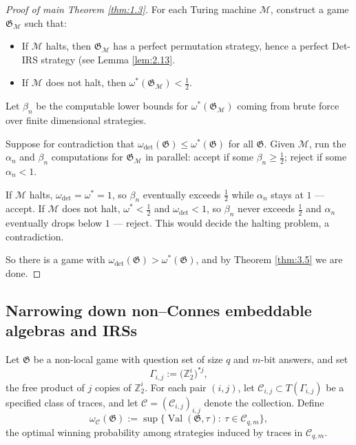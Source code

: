 \documentclass[pdflatex,sn-mathphys-num]{sn-jnl}%
\begin{document}
\begin{proof}[Proof of main Theorem \ref{thm:1.3}]
    For each Turing machine $\mathcal{M}$, \cite{bowen_aldous--lyons_2024} construct a game $\mathfrak{G}_\mathcal{M}$ such that:
    \begin{itemize}
        \item If $\mathcal{M}$ halts, then $\mathfrak{G}_\mathcal{M}$ has a perfect permutation strategy, hence a perfect Det-IRS strategy (see Lemma \ref{lem:2.13}.
        \item If $\mathcal{M}$ does not halt, then $\omega^*(\mathfrak{G}_\mathcal{M}) < \tfrac12$.
    \end{itemize}
    Let $\beta_n$ be the computable lower bounds for $\omega^*(\mathfrak{G}_\mathcal{M})$ coming from brute force over finite dimensional strategies.

    Suppose for contradiction that $\omega_{\mathrm{det}}(\mathfrak{G}) \leq \omega^*(\mathfrak{G})$ for all $\mathfrak{G}$.  
    Given $\mathcal{M}$, run the $\alpha_n$ and $\beta_n$ computations for $\mathfrak{G}_\mathcal{M}$ in parallel:  
    accept if some $\beta_n \geq \tfrac12$; reject if some $\alpha_n < 1$.

    If $\mathcal{M}$ halts, $\omega_{\mathrm{det}} = \omega^* = 1$,  
    so $\beta_n$ eventually exceeds $\tfrac12$ while $\alpha_n$ stays at $1$ — accept.  
    If $\mathcal{M}$ does not halt, $\omega^* < \tfrac12$ and $\omega_{\mathrm{det}} < 1$,  
    so $\beta_n$ never exceeds $\tfrac12$ and $\alpha_n$ eventually drops below $1$ — reject.  
    This would decide the halting problem, a contradiction.

    So there is a game with $\omega_{\mathrm{det}}(\mathfrak{G}) > \omega^*(\mathfrak{G})$, and by Theorem \ref{thm:3.5} we are done.
\end{proof}

\subsection{Narrowing down non--Connes embeddable algebras and IRSs}\label{sec:3.2}

Let $\mathfrak{G}$ be a non-local game with question set of size $q$ and $m$-bit answers, and set
\[
  \Gamma_{i,j} := \bigl(\mathbb{Z}_2^i \bigr)^{*j},
\]
the free product of $j$ copies of $\mathbb{Z}_2^i$. For each pair $(i,j)$, let $\mathcal{C}_{i,j}\subset T(\Gamma_{i,j})$ be a specified class of traces, and let
$\mathcal{C} = (\mathcal{C}_{i,j})_{i,j}$ denote the collection.  
Define
\[
  \omega_{\mathcal{C}}(\mathfrak{G})
  := \sup\{\operatorname{Val}(\mathfrak{G},\tau):\ \tau\in\mathcal{C}_{q,m}\},
\]
the optimal winning probability among strategies induced by traces in $\mathcal{C}_{q,m}$.  
\end{document}
